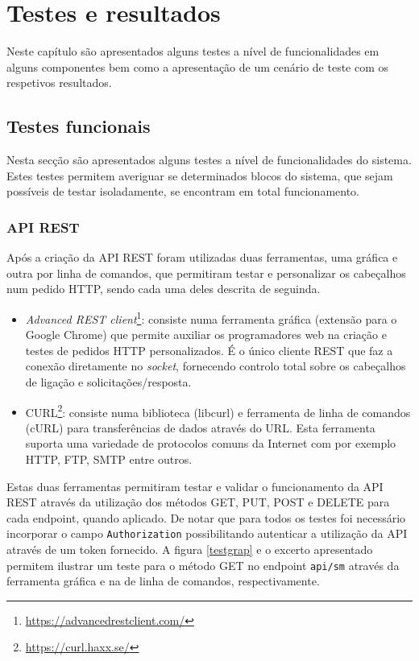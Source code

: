 \chapter{Testes e resultados}

Neste capítulo são apresentados alguns testes a nível de funcionalidades em alguns componentes bem como a apresentação de um cenário de teste com os respetivos resultados. 




\section{Testes funcionais}


Nesta secção são apresentados alguns testes a nível de funcionalidades do sistema. Estes testes permitem averiguar se determinados blocos do sistema, que sejam possíveis de testar isoladamente, se encontram em total funcionamento. 

\subsection{API REST}


Após a criação da API REST foram utilizadas duas ferramentas, uma gráfica e outra por linha de comandos, que permitiram testar e personalizar os cabeçalhos num pedido HTTP, sendo cada uma deles descrita de seguinda.


\begin{itemize}
	\item \textit{Advanced REST client}\footnote{\url{https://advancedrestclient.com/}}: consiste numa ferramenta gráfica (extensão para o Google Chrome) que permite auxiliar os programadores web na criação e testes de pedidos \ac{HTTP} personalizados. É o único cliente \ac{REST} que faz a conexão diretamente no \textit{socket}, fornecendo controlo total sobre os cabeçalhos de ligação e solicitações/resposta.
	 
	\item CURL\footnote{\url{https://curl.haxx.se/}}: consiste numa biblioteca (libcurl) e ferramenta de linha de comandos (cURL) para transferências de dados através do \ac{URL}. Esta ferramenta suporta uma variedade de protocolos comuns da Internet com por exemplo \ac{HTTP}, \ac{FTP}, \ac{SMTP} entre outros. 
\end{itemize}


Estas duas ferramentas permitiram testar e validar o funcionamento da API REST através da utilização dos métodos GET, PUT, POST e DELETE para cada endpoint, quando aplicado. De notar que para todos os testes foi necessário incorporar o campo \texttt{Authorization} possibilitando autenticar a utilização da API através de um token fornecido. A figura \ref{testgrap} e o excerto apresentado permitem ilustrar um teste para o método GET no endpoint \texttt{api/sm} através da ferramenta gráfica e na de linha de comandos, respectivamente. 







